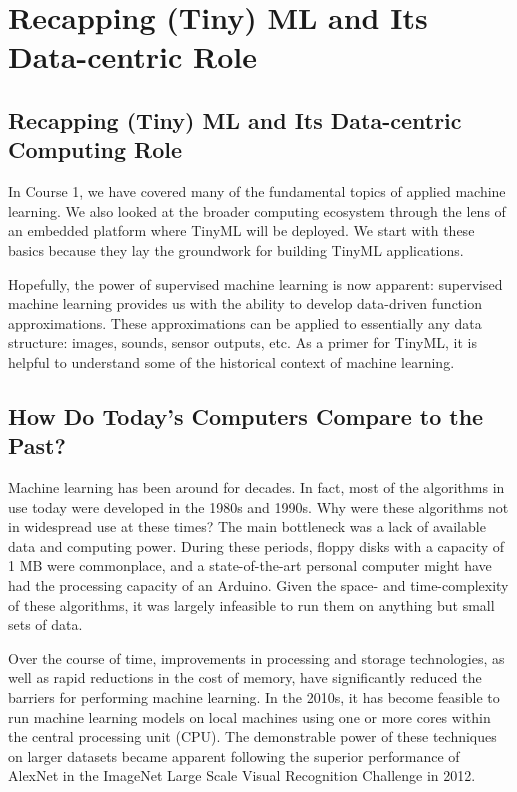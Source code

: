 \section{Recapping (Tiny) ML and Its Data-centric Role}

\subsection{Recapping (Tiny) ML and Its Data-centric Computing Role}
In Course 1, we have covered many of the fundamental topics of applied machine learning. We also looked at the broader computing ecosystem through the lens of an embedded platform where TinyML will be deployed. We start with these basics because they lay the groundwork for building TinyML applications. 

Hopefully, the power of supervised machine learning is now apparent: supervised machine learning provides us with the ability to develop data-driven function approximations. These approximations can be applied to essentially any data structure: images, sounds, sensor outputs, etc. As a primer for TinyML, it is helpful to understand some of the historical context of machine learning.

\subsection{How Do Today's Computers Compare to the Past?}

Machine learning has been around for decades. In fact, most of the algorithms in use today were developed in the 1980s and 1990s. Why were these algorithms not in widespread use at these times? The main bottleneck was a lack of available data and computing power. During these periods, floppy disks with a capacity of 1 MB were commonplace, and a state-of-the-art personal computer might have had the processing capacity of an Arduino. Given the space- and time-complexity of these algorithms, it was largely infeasible to run them on anything but small sets of data.

Over the course of time, improvements in processing and storage technologies, as well as rapid reductions in the cost of memory, have significantly reduced the barriers for performing machine learning. In the 2010s, it has become feasible to run machine learning models on local machines using one or more cores within the central processing unit (CPU). The demonstrable power of these techniques on larger datasets became apparent following the superior performance of AlexNet in the ImageNet Large Scale Visual Recognition Challenge in 2012.


